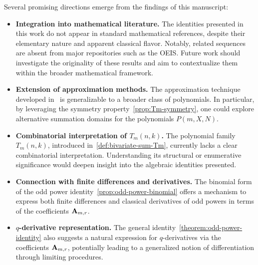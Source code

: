 Several promising directions emerge from the findings of this manuscript:

\begin{itemize}
    \item \textbf{Integration into mathematical literature.}
    The identities presented in this work do not appear in standard mathematical references,
    despite their elementary nature and apparent classical flavor.
    Notably, related sequences are absent from major repositories such as the OEIS\@.
    Future work should investigate the originality of these results and aim to contextualize
    them within the broader mathematical framework.

    \item \textbf{Extension of approximation methods.}
    The approximation technique developed in~\cite{kolosov2025efficient} is generalizable
    to a broader class of polynomials.
    In particular, by leveraging the symmetry property~\eqref{prop:Tm-symmetry},
    one could explore alternative summation domains for the polynomials $P(m, X, N)$.

    \item \textbf{Combinatorial interpretation of $T_m(n,k)$.}
    The polynomial family $T_m(n,k)$, introduced in~\eqref{def:bivariate-sum-Tm},
    currently lacks a clear combinatorial interpretation.
    Understanding its structural or enumerative significance would deepen insight into
    the algebraic identities presented.

    \item \textbf{Connection with finite differences and derivatives.}
    The binomial form of the odd power identity~\eqref{prop:odd-power-binomial} offers a mechanism
    to express both finite differences and classical derivatives of odd powers in terms
    of the coefficients ${\mathbf{A}} \sb{m,r}$.

    \item \textbf{$q$-derivative representation.}
    The general identity~\eqref{theorem:odd-power-identity} also suggests a natural
    expression for $q$-derivatives via the coefficients ${\mathbf{A}} \sb{m,r}$,
    potentially leading to a generalized notion of differentiation through limiting procedures.
\end{itemize}
